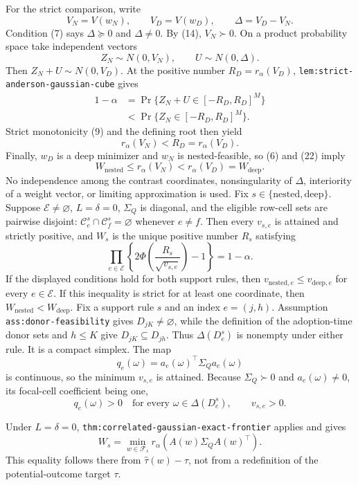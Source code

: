 For the strict comparison, write
\[
 V_N=V(w_N),\qquad V_D=V(w_D),\qquad
 \Delta=V_D-V_N. \tag{19}
\]
Condition (7) says \(\Delta\succeq0\) and \(\Delta\ne0\).  By (14),
\(V_N\succ0\).  On a product probability space take independent vectors
\[
 Z_N\sim N(0,V_N),\qquad U\sim N(0,\Delta). \tag{20}
\]
Then \(Z_N+U\sim N(0,V_D)\).  At the positive number
\(R_D=r_\alpha(V_D)\),
\texttt{lem:strict-anderson-gaussian-cube} gives
\[
\begin{aligned}
 1-\alpha
 &=\Pr\{Z_N+U\in[-R_D,R_D]^M\}\\
 &<\Pr\{Z_N\in[-R_D,R_D]^M\}.
\end{aligned} \tag{21}
\]
Strict monotonicity (9) and the defining root then yield
\[
 r_\alpha(V_N)<R_D=r_\alpha(V_D). \tag{22}
\]
Finally, \(w_D\) is a deep minimizer and \(w_N\) is nested-feasible, so (6)
and (22) imply
\[
 W_{\mathrm{nested}}
 \leq r_\alpha(V_N)
 <r_\alpha(V_D)
 =W_{\mathrm{deep}}. \tag{23}
\]
No independence among the contrast coordinates, nonsingularity of
\(\Delta\), interiority of a weight vector, or limiting approximation is
used.
Fix \(s\in\{\mathrm{nested},\mathrm{deep}\}\).  Suppose
\(\mathcal E\ne\varnothing\), \(L=\delta=0\), \(\Sigma_Q\) is diagonal, and
the eligible row-cell sets are pairwise disjoint:
\(\mathcal C^s_e\cap\mathcal C^s_f=\varnothing\) whenever \(e\ne f\).
Then every \(v_{s,e}\) is attained and strictly positive, and \(W_s\) is the
unique positive number \(R_s\) satisfying
\[
 \prod_{e\in\mathcal E}
 \left\{2\Phi\!\left(\frac{R_s}{\sqrt{v_{s,e}}}\right)-1\right\}
 =1-\alpha. \tag{8}
\]
If the displayed conditions hold for both support rules, then
\(v_{\mathrm{nested},e}\leq v_{\mathrm{deep},e}\) for every
\(e\in\mathcal E\).  If this inequality is strict for at least one
coordinate, then \(W_{\mathrm{nested}}<W_{\mathrm{deep}}\).
Fix a support rule \(s\) and an index \(e=(j,h)\).  Assumption
\texttt{ass:donor-feasibility} gives \(D_{jK}\ne\varnothing\), while the
definition of the adoption-time donor sets and \(h\leq K\) give
\(D_{jK}\subseteq D_{jh}\).  Thus \(\Delta(D^s_e)\) is nonempty under
either rule.  It is a compact simplex.  The map
\[
 q_e(\omega)=a_e(\omega)^{\top}\Sigma_Qa_e(\omega) \tag{24}
\]
is continuous, so the minimum \(v_{s,e}\) is attained.  Because
\(\Sigma_Q\succ0\) and \(a_e(\omega)\ne0\), its focal-cell coefficient being
one,
\[
 q_e(\omega)>0\quad\text{for every }\omega\in\Delta(D^s_e),
 \qquad v_{s,e}>0. \tag{25}
\]

Under \(L=\delta=0\),
\texttt{thm:correlated-gaussian-exact-frontier} applies and gives
\[
 W_s=\min_{w\in\mathcal F_s}r_\alpha
 \!\left(A(w)\Sigma_QA(w)^{\top}\right). \tag{26}
\]
This equality follows there from
\(\widehat\tau(w)-\tau\), not from a redefinition of the potential-outcome
target \(\tau\).

